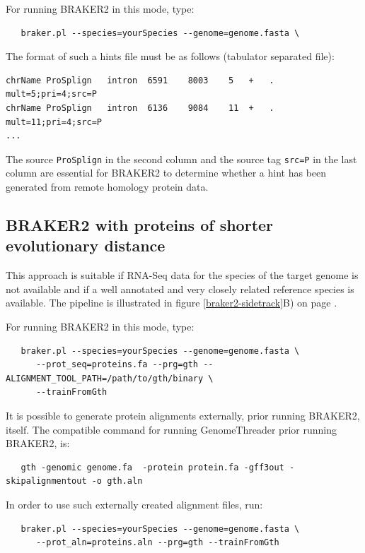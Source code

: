 \documentclass[a4paper,10pt]{report}
\begin{document}
For running BRAKER2 in this mode, type:

\begin{verbatim}
   braker.pl --species=yourSpecies --genome=genome.fasta \
\end{verbatim}

The format of such a hints file must be as follows (tabulator separated file):

\begin{verbatim}
chrName	ProSplign	intron	6591	8003	5	+	.	mult=5;pri=4;src=P
chrName	ProSplign	intron	6136	9084	11	+	.	mult=11;pri=4;src=P
...
\end{verbatim}

The source \texttt{ProSplign} in the second column and the source tag \texttt{src=P} in the last column are essential for BRAKER2 to determine whether a hint has been generated from remote homology protein data. 

\subsection{BRAKER2 with proteins of shorter evolutionary distance}\label{prot-in}

This approach is suitable if RNA-Seq data for the species of the target genome is not available and if a well annotated and very closely related reference species is available. The pipeline is illustrated in figure \ref{braker2-sidetrack}B) on page \pageref{braker2-sidetrack}.

For running BRAKER2 in this mode, type:

\begin{verbatim}
   braker.pl --species=yourSpecies --genome=genome.fasta \
      --prot_seq=proteins.fa --prg=gth --ALIGNMENT_TOOL_PATH=/path/to/gth/binary \
      --trainFromGth
\end{verbatim}

It is possible to generate protein alignments externally, prior running BRAKER2, itself. The compatible command for running GenomeThreader prior running BRAKER2, is:

\begin{verbatim}
   gth -genomic genome.fa  -protein protein.fa -gff3out -skipalignmentout -o gth.aln
\end{verbatim}


In order to use such externally created alignment files, run:

\begin{verbatim}
   braker.pl --species=yourSpecies --genome=genome.fasta \
      --prot_aln=proteins.aln --prg=gth --trainFromGth
\end{verbatim}
\end{document}
